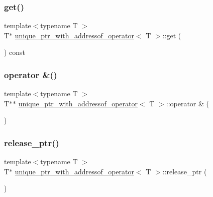 \subsubsection{\texorpdfstring{get()}{get()}}
{\footnotesize\ttfamily template$<$typename T $>$ \\
T$\ast$ \mbox{\hyperlink{classunique__ptr__with__addressof__operator}{unique\+\_\+ptr\+\_\+with\+\_\+addressof\+\_\+operator}}$<$ T $>$\+::get (\begin{DoxyParamCaption}{ }\end{DoxyParamCaption}) const\hspace{0.3cm}{\ttfamily [inline]}}

\mbox{\label{classunique__ptr__with__addressof__operator_a1a61a13e5f8d71ec248d5ef1b4f25017}} 
\subsubsection{\texorpdfstring{operator \&()}{operator \&()}}
{\footnotesize\ttfamily template$<$typename T $>$ \\
T$\ast$$\ast$ \mbox{\hyperlink{classunique__ptr__with__addressof__operator}{unique\+\_\+ptr\+\_\+with\+\_\+addressof\+\_\+operator}}$<$ T $>$\+::operator \& (\begin{DoxyParamCaption}{ }\end{DoxyParamCaption})\hspace{0.3cm}{\ttfamily [inline]}}

\mbox{\label{classunique__ptr__with__addressof__operator_aad95d7bacc382a862d256b6b246864f1}} 
\subsubsection{\texorpdfstring{release\_ptr()}{release\_ptr()}}
{\footnotesize\ttfamily template$<$typename T $>$ \\
T$\ast$ \mbox{\hyperlink{classunique__ptr__with__addressof__operator}{unique\+\_\+ptr\+\_\+with\+\_\+addressof\+\_\+operator}}$<$ T $>$\+::release\+\_\+ptr (\begin{DoxyParamCaption}{ }\end{DoxyParamCaption})\hspace{0.3cm}{\ttfamily [inline]}}



